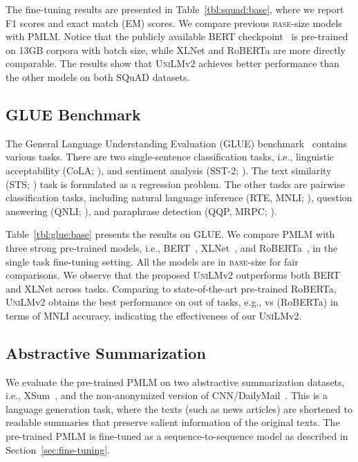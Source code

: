 \documentclass{article}
\newcommand\pmlm{\textsc{PMLM}}
\newcommand{\bertbase}{BERT}
\newcommand{\xlnetbase}{XLNet}
\newcommand{\robertabase}{RoBERTa}
\newcommand{\vtwobase}{\textsc{UniLM}v2}
\begin{document}
The fine-tuning results are presented in Table~\ref{tbl:squad:base}, where we report F1 scores and exact match (EM) scores.
We compare previous \textsc{base}-size models with \pmlm{}.
Notice that the publicly available \bertbase{} checkpoint~\cite{bert} is pre-trained on 13GB corpora with  batch size, while \xlnetbase{} and \robertabase{} are more directly comparable.
The results show that \vtwobase{} achieves better performance than the other models on both SQuAD datasets.


\subsection{GLUE Benchmark}
\label{sec:glue}

The General Language Understanding Evaluation (GLUE) benchmark~\cite{wang2018glue} contains various tasks.
There are two single-sentence classification tasks, i.e., linguistic acceptability (CoLA; \citealt{cola2018}), and sentiment analysis (SST-2; \citealt{sst2013}).
The text similarity (STS; \citealt{sts-b2017}) task is formulated as a regression problem.
The other tasks are pairwise classification tasks, including natural language inference (RTE, MNLI; \citealt{rte1,rte2,rte3,rte5,mnli2017}), question answering (QNLI; \citealt{squad1}), and paraphrase detection (QQP, MRPC; \citealt{mrpc2005}).



Table~\ref{tbl:glue:base} presents the results on GLUE.
We compare \pmlm{} with three strong pre-trained models, i.e., BERT~\cite{bert}, XLNet~\cite{xlnet}, and RoBERTa~\cite{roberta}, in the single task fine-tuning setting.
All the models are in \textsc{base}-size for fair comparisons.
We observe that the proposed \vtwobase{} outperforms both \bertbase{} and \xlnetbase{} across  tasks. Comparing to state-of-the-art pre-trained \robertabase{}, \vtwobase{} obtains the best performance on  out of  tasks, e.g.,  vs  (\robertabase{}) in terms of MNLI accuracy, indicating the effectiveness of our \vtwobase{}. 

\subsection{Abstractive Summarization}

We evaluate the pre-trained \pmlm{} on two abstractive summarization datasets, i.e., XSum~\cite{xsum}, and the non-anonymized version of CNN/DailyMail~\cite{see-2017-get}.
This is a language generation task, where the texts (such as news articles) are shortened to readable summaries that preserve salient information of the original texts.
The pre-trained \pmlm{} is fine-tuned as a sequence-to-sequence model as described in Section~\ref{sec:fine-tuning}.
\end{document}
